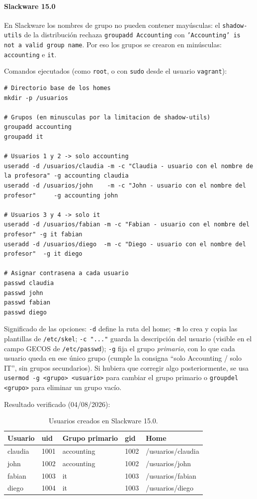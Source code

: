 \documentclass[11pt,a4paper]{report}
\begin{document}
\paragraph*{Slackware 15.0}

En Slackware los nombres de grupo no pueden contener mayúsculas: el \texttt{shadow-utils} de la distribución rechaza \texttt{groupadd Accounting} con \texttt{'Accounting' is not a valid group name}. Por eso los grupos se crearon en minúsculas: \texttt{accounting} e \texttt{it}.

Comandos ejecutados (como \texttt{root}, o con \texttt{sudo} desde el usuario \texttt{vagrant}):

\begin{lstlisting}
# Directorio base de los homes
mkdir -p /usuarios

# Grupos (en minusculas por la limitacion de shadow-utils)
groupadd accounting
groupadd it

# Usuarios 1 y 2 -> solo accounting
useradd -d /usuarios/claudia -m -c "Claudia - usuario con el nombre de la profesora" -g accounting claudia
useradd -d /usuarios/john    -m -c "John - usuario con el nombre del profesor"     -g accounting john

# Usuarios 3 y 4 -> solo it
useradd -d /usuarios/fabian -m -c "Fabian - usuario con el nombre del profesor" -g it fabian
useradd -d /usuarios/diego  -m -c "Diego - usuario con el nombre del profesor"  -g it diego

# Asignar contrasena a cada usuario
passwd claudia
passwd john
passwd fabian
passwd diego
\end{lstlisting}

Significado de las opciones: \texttt{-d} define la ruta del home; \texttt{-m} lo crea y copia las plantillas de \texttt{/etc/skel}; \texttt{-c "..."} guarda la descripción del usuario (visible en el campo GECOS de \texttt{/etc/passwd}); \texttt{-g} fija el grupo \emph{primario}, con lo que cada usuario queda en ese único grupo (cumple la consigna ``solo Accounting / solo IT'', sin grupos secundarios). Si hubiera que corregir algo posteriormente, se usa \texttt{usermod -g <grupo> <usuario>} para cambiar el grupo primario o \texttt{groupdel <grupo>} para eliminar un grupo vacío.

Resultado verificado (04/08/2026):

\begin{table}[H]
  \centering
  \begin{tabular}{@{}lllll@{}}
    \toprule
    \textbf{Usuario} & \textbf{uid} & \textbf{Grupo primario} & \textbf{gid} & \textbf{Home} \\
    \midrule
    claudia & 1001 & accounting & 1002 & /usuarios/claudia \\
    john    & 1002 & accounting & 1002 & /usuarios/john \\
    fabian  & 1003 & it         & 1003 & /usuarios/fabian \\
    diego   & 1004 & it         & 1003 & /usuarios/diego \\
    \bottomrule
  \end{tabular}
  \caption{Usuarios creados en Slackware 15.0.}
  \label{tab:slack-users}
\end{table}
\end{document}
